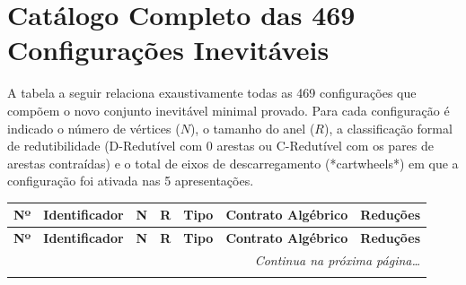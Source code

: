 \documentclass[11pt,a4paper]{article}
\begin{document}
\section{Catálogo Completo das 469 Configurações Inevitáveis}

A tabela a seguir relaciona exaustivamente todas as 469 configurações que compõem o novo conjunto inevitável minimal provado. Para cada configuração é indicado o número de vértices ($N$), o tamanho do anel ($R$), a classificação formal de redutibilidade (D-Redutível com 0 arestas ou C-Redutível com os pares de arestas contraídas) e o total de eixos de descarregamento (*cartwheels*) em que a configuração foi ativada nas 5 apresentações.

\vspace{0.3cm}

\begin{small}
\begin{longtable}{r l c c c l r}
\toprule
\textbf{Nº} & \textbf{Identificador} & \textbf{N} & \textbf{R} & \textbf{Tipo} & \textbf{Contrato Algébrico} & \textbf{Reduções} \\
\midrule
\endfirsthead
\toprule
\textbf{Nº} & \textbf{Identificador} & \textbf{N} & \textbf{R} & \textbf{Tipo} & \textbf{Contrato Algébrico} & \textbf{Reduções} \\
\midrule
\endhead
\midrule
\multicolumn{7}{r}{\textit{Continua na próxima página\dots}} \\
\bottomrule
\endfoot
\bottomrule
\endlastfoot


\end{longtable}
\end{small}
\end{document}
